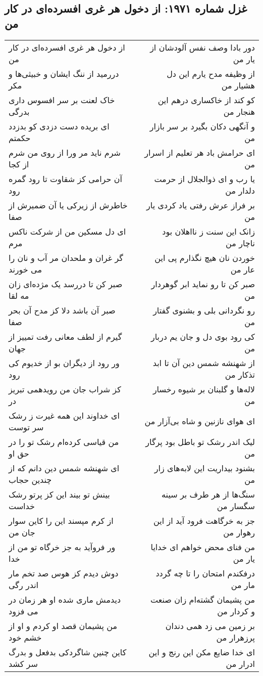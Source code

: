 \begin{center}
\section*{غزل شماره ۱۹۷۱: از دخول هر غری افسرده‌ای در کار من}
\label{sec:1971}
\begin{longtable}{l p{0.5cm} r}
از دخول هر غری افسرده‌ای در کار من
&&
دور بادا وصف نفس آلودشان از یار من
\\
دررمید از ننگ ایشان و خبیثی‌ها و مکر
&&
از وظیفه مدح یارم این دل هشیار من
\\
خاک لعنت بر سر افسوس داری بدرگی
&&
کو کند از خاکساری درهم این هنجار من
\\
ای بریده دست دزدی کو بدزدد حکمتم
&&
و آنگهی دکان بگیرد بر سر بازار من
\\
شرم ناید مر ورا از روی من شرم از کجا
&&
ای حرامش باد هر تعلیم از اسرار من
\\
آن حرامی کز شقاوت تا رود گمره رود
&&
یا رب و ای ذوالجلال از حرمت دلدار من
\\
خاطرش از زیرکی یا آن ضمیرش از صفا
&&
بر فراز عرش رفتی یاد کردی یار من
\\
ای دل مسکین من از شرکت ناکس مرم
&&
زانک این سنت ز نااهلان بود ناچار من
\\
گر غران و ملحدان مر آب و نان را می خورند
&&
خوردن نان هیچ نگذارم پی این عار من
\\
صبر کن تا دررسد یک مژده‌ای زان مه لقا
&&
صبر کن تا رو نماید ابر گوهردار من
\\
صبر آن باشد دلا کز مدح آن بحر صفا
&&
رو نگردانی بلی و بشنوی گفتار من
\\
گیرم از لطف معانی رفت تمییز از جهان
&&
کی رود بوی دل و جان یم دربار من
\\
ور رود از دیگران بو از خدیوم کی رود
&&
از شهنشه شمس دین آن تا ابد تذکار من
\\
کز شراب جان من رویدهمی تبریز در
&&
لاله‌ها و گلبنان بر شیوه رخسار من
\\
ای خداوند این همه غیرت ز رشک سر توست
&&
ای هوای نازنین و شاه بی‌آزار من
\\
من قیاسی کرده‌ام رشک تو را در حق او
&&
لیک اندر رشک تو باطل بود پرگار من
\\
ای شهنشه شمس دین دانم که از چندین حجاب
&&
بشنود بیداریت این لابه‌های زار من
\\
بینش تو بیند این کز پرتو رشک خداست
&&
سنگ‌ها از هر طرف بر سینه سگسار من
\\
از کرم مپسند این را کاین سوار جان من
&&
جز به خرگاهت فرود آید از این رهوار من
\\
ور فروآید به جز خرگاه تو من از خدا
&&
من فنای محض خواهم ای خدایا یار من
\\
دوش دیدم کز هوس صد تخم مار اندر رگی
&&
درفکندم امتحان را تا چه گردد مار من
\\
دیدمش ماری شده او هر زمان در می فزود
&&
من پشیمان گشته‌ام زان صنعت و کردار من
\\
من پشیمان قصد او کردم و او از خشم خود
&&
بر زمین می زد همی دندان پرزهرار من
\\
کاین چنین شاگردکی بدفعل و بدرگ سر کشد
&&
ای خدا ضایع مکن این رنج و این ادرار من
\\
\end{longtable}
\end{center}
